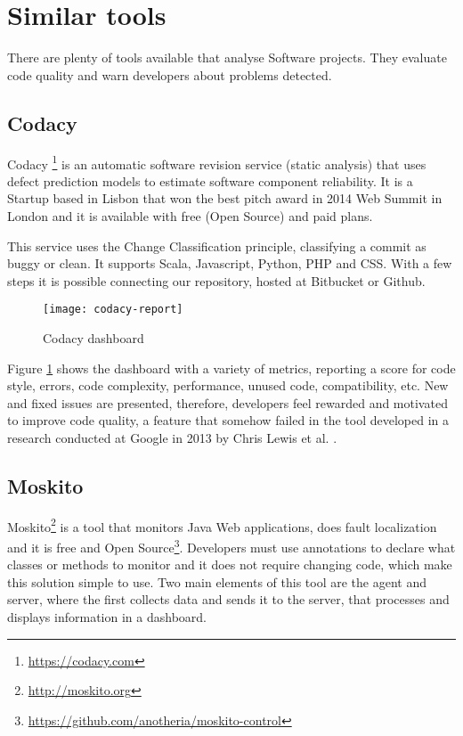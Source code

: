 \section{Similar tools}
There are plenty of tools available that analyse Software projects. They evaluate code quality and warn developers about problems detected.

\subsection{Codacy}

Codacy \footnote{\url{https://codacy.com}} is an automatic software revision service (static analysis) that uses defect prediction models to estimate software component reliability. It is a Startup based in Lisbon that won the best pitch award in 2014 Web Summit in London and it is available with free (Open Source) and paid plans.

This service uses the Change Classification principle, classifying a commit as buggy or clean. It supports Scala, Javascript, Python, PHP and CSS. With a few steps it is possible connecting our repository, hosted at Bitbucket or Github.

\begin{figure}[H]
    \begin{center}
        \texttt{[image: codacy-report]}
        \caption{Codacy dashboard}
        \label{figure:codacy_dashboard}
    \end{center}
\end{figure}


Figure \ref{figure:codacy_dashboard} shows the dashboard with a variety of metrics, reporting a score for code style, errors, code complexity, performance, unused code, compatibility, etc. New and fixed issues are presented, therefore, developers feel  rewarded and motivated to improve code quality, a feature that somehow failed in the tool developed in a research conducted at Google in 2013 by Chris Lewis et al. \cite{Chris2013}.

\subsection{Moskito}
Moskito\footnote{\url{http://moskito.org}} is a tool that monitors Java Web applications, does fault localization and it is free and Open Source\footnote{\url{https://github.com/anotheria/moskito-control}}. Developers must use annotations to declare what classes or methods to monitor and it does not require changing code, which make this solution simple to use. Two main elements of this tool are the agent and server, where the first collects data and sends it to the server, that processes and displays information in a dashboard.

